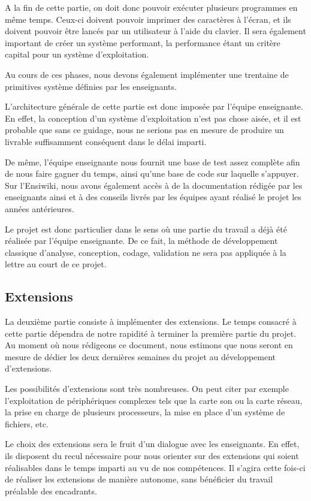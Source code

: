 \documentclass[a4paper, 11pt, titlepage]{article}
\begin{document}
A la fin de cette partie, on doit donc pouvoir exécuter plusieurs programmes en même temps. Ceux-ci doivent pouvoir imprimer des caractères à l'écran, et ils doivent pouvoir être lancés par un utilisateur à l'aide du clavier. Il sera également important de créer un système performant, la performance étant un critère capital pour un système d'exploitation.

Au cours de ces phases, nous devons également implémenter une trentaine de primitives système définies par les enseignants.

L'architecture générale de cette partie est donc imposée par l'équipe enseignante. En effet, la conception d'un système d'exploitation n'est pas chose aisée, et il est probable que sans ce guidage, nous ne serions pas en mesure de produire un livrable suffisamment conséquent dans le délai imparti.

De même, l'équipe enseignante nous fournit une base de test assez complète afin de nous faire gagner du temps, ainsi qu'une base de code sur laquelle s'appuyer. Sur l'Ensiwiki, nous avons également accès à de la documentation rédigée par les enseignants ainsi et à des conseils livrés par les équipes ayant réalisé le projet les années antérieures.

Le projet est donc particulier dans le sens où une partie du travail a déjà été réalisée par l'équipe enseignante. De ce fait, la méthode de développement classique d'analyse, conception, codage, validation ne sera pas appliquée à la lettre au court de ce projet.


\subsection{Extensions}

La deuxième partie consiste à implémenter des extensions. Le temps consacré à cette partie dépendra de notre rapidité à terminer la première partie du projet. Au moment où nous rédigeons ce document, nous estimons que nous seront en mesure de dédier les deux dernières semaines du projet au développement d'extensions. 

Les possibilités d'extensions sont très nombreuses. On peut citer par exemple l'exploitation de périphériques complexes tels que la carte son ou la carte réseau, la prise en charge de plusieurs processeurs, la mise en place d'un système de fichiers, etc.

Le choix des extensions sera le fruit d'un dialogue avec les enseignants. En effet, ils disposent du recul nécessaire pour nous orienter sur des extensions qui soient réalisables dans le temps imparti au vu de nos compétences.
Il s'agira cette fois-ci de réaliser les extensions de manière autonome, sans bénéficier du travail préalable des encadrants.
\end{document}
